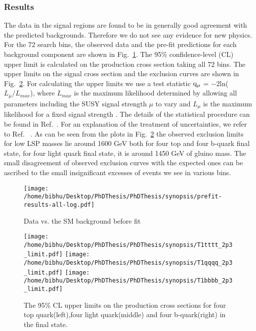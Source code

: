 

\subsubsection{Results}
The data in the signal regions are found to be in 
generally good agreement with the predicted backgrounds. Therefore we do not see any evidence for new physics. For the 72
search bins, the observed data and the pre-fit predictions for each background component are shown in Fig.~\ref{fig:Datavsbkg}. The 95\% confidence-level   (CL) upper limit is calculated on the production cross section taking all 72 bins. The upper limits on the signal cross section and the exclusion curves are shown in Fig.~\ref{fig:Limit2015Synop}. For calculating the upper limits we use  a test  statistic  $\rm q_{\mu}$ = $-$2ln($L_{\mu}/L_{max}$), where $L_{max}$ is the maximum likelihood determined by allowing all parameters including the SUSY signal strength $\mu$ to vary and $L_{\mu}$ is the maximum likelihood for a fixed signal strength . The details of the statistical procedure can be found in Ref.~\cite{CMS-NOTE-2011-005}.  For an explanation of the treatment of uncertainties, we refer to Ref. ~\cite{CMS-PAS-SUS-15-002}. As can be seen from the plots in Fig.~\ref{fig:Limit2015Synop} the observed exclusion limits for low LSP masses lie around 1600 GeV both for four top and four b-quark final state, for four light quark final state, it is around 1450 GeV of gluino mass. The small disagreement of observed exclusion curves with the expected ones can be ascribed to the small insignificant excesses of events we see in various bins.  
\begin{figure}[h]
\begin{center}
\texttt{[image: /home/bibhu/Desktop/PhDThesis/PhDThesis/synopsis/prefit-results-all-log.pdf]}
\caption{\label{fig:Datavsbkg} Data vs. the SM background before fit}
\end{center}
\end{figure}
\begin{figure}[h]
\centering
\texttt{[image: /home/bibhu/Desktop/PhDThesis/PhDThesis/synopsis/T1tttt\_2p3\_limit.pdf]}
\texttt{[image: /home/bibhu/Desktop/PhDThesis/PhDThesis/synopsis/T1qqqq\_2p3\_limit.pdf]}
\texttt{[image: /home/bibhu/Desktop/PhDThesis/PhDThesis/synopsis/T1bbbb\_2p3\_limit.pdf]}
\caption{\label{fig:Limit2015Synop}The 95\% CL upper limits on the production cross sections for four top quark(left),four light quark(middle) and four b-quark(right) in the final state. }
\end{figure}

